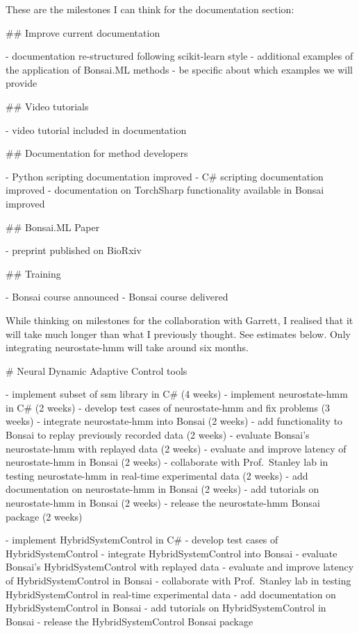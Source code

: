 These are the milestones I can think for the documentation section:

## Improve current documentation

- documentation re-structured following scikit-learn style
- additional examples of the application of Bonsai.ML methods
- be specific about which examples we will provide

## Video tutorials

- video tutorial included in documentation

## Documentation for method developers

- Python scripting documentation improved
- C# scripting documentation improved
- documentation on TorchSharp functionality available in Bonsai improved

## Bonsai.ML Paper

- preprint published on BioRxiv

## Training

- Bonsai course announced
- Bonsai course delivered

While thinking on milestones for the collaboration with Garrett, I
realised that it will take much longer than what I previously thought.
See estimates below. Only integrating neurostate-hmm will take around
six months.

# Neural Dynamic Adaptive Control tools

- implement subset of ssm library in C# (4 weeks)
- implement neurostate-hmm in C# (2 weeks)
- develop test cases of neurostate-hmm and fix problems (3 weeks)
- integrate neurostate-hmm into Bonsai (2 weeks)
- add functionality to Bonsai to replay previously recorded data (2 weeks)
- evaluate Bonsai's neurostate-hmm with replayed data (2 weeks)
- evaluate and improve latency of neurostate-hmm in Bonsai (2 weeks)
- collaborate with Prof.~Stanley lab in testing neurostate-hmm in real-time experimental data (2 weeks)
- add documentation on neurostate-hmm in Bonsai (2 weeks)
- add tutorials on neurostate-hmm in Bonsai (2 weeks)
- release the neurostate-hmm Bonsai package (2 weeks)

- implement HybridSystemControl in C#
- develop test cases of HybridSystemControl
- integrate HybridSystemControl into Bonsai
- evaluate Bonsai's HybridSystemControl with replayed data
- evaluate and improve latency of HybridSystemControl in Bonsai
- collaborate with Prof.~Stanley lab in testing HybridSystemControl in real-time experimental data
- add documentation on HybridSystemControl in Bonsai
- add tutorials on HybridSystemControl in Bonsai
- release the HybridSystemControl Bonsai package